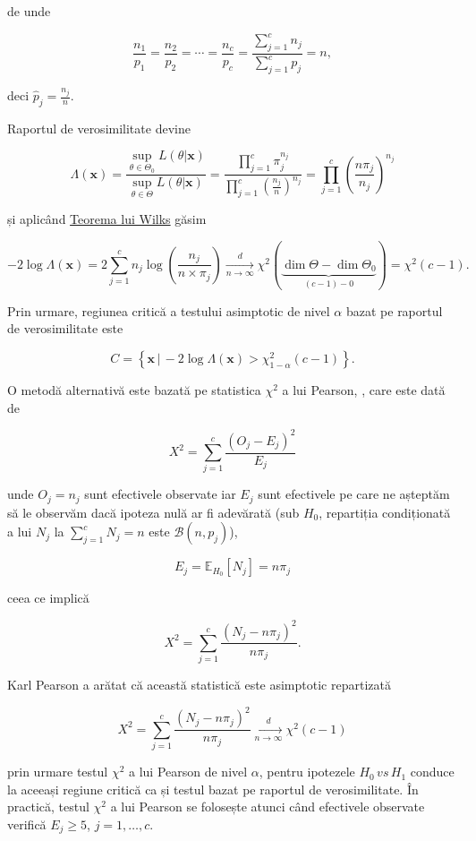 \documentclass[]{article}
\begin{document}
de unde

\[
  \frac{n_1}{p_1} = \frac{n_2}{p_2} = \cdots = \frac{n_c}{p_c} = \frac{\sum_{j = 1}^{c}n_j}{\sum_{j = 1}^{c}p_j} = n,
\]

deci \(\hat{p}_{j} = \frac{n_j}{n}\).

Raportul de verosimilitate devine

\[
\Lambda(\mathbf{x})=\frac{\sup_{\theta\in\Theta_0}L(\theta|\mathbf{x})}{\sup_{\theta\in\Theta}L(\theta|\mathbf{x})} = \frac{\prod_{j = 1}^{c} \pi_{j}^{n_{j}}}{\prod_{j = 1}^{c} \left(\frac{n_{j}}{n}\right)^{n_{j}}} = \prod_{j = 1}^{c}\left(\frac{n\pi_{j}}{n_j}\right)^{n_{j}}
\]

și aplicând
\href{https://en.wikipedia.org/wiki/Likelihood-ratio_test}{Teorema lui
Wilks} găsim

\[
  -2\log \Lambda(\mathbf{x}) = 2\sum_{j = 1}^{c} n_{j}\log\left(\frac{n_{j}}{n\times \pi_{j}}\right) \underset{n\to\infty}{\overset{d}{\longrightarrow}}\chi^2(\underbrace{\dim{\Theta} - \dim{\Theta_0}}_{(c-1)-0}) = \chi^2(c-1).
\]

Prin urmare, regiunea critică a testului asimptotic de nivel \(\alpha\)
bazat pe raportul de verosimilitate este

\[
  C = \left\{\mathbf{x} \,|\, -2\log \Lambda(\mathbf{x}) > \chi^2_{1-\alpha}(c-1)\right\}.
\]

O metodă alternativă este bazată pe statistica \(\chi^2\) a lui Pearson,
\citep{Pearson1900}, care este dată de

\[
  X^2 = \sum_{j = 1}^{c}\frac{(O_{j} - E_{j})^2}{E_{j}}
\]

unde \(O_{j} = n_{j}\) sunt efectivele observate iar \(E_{j}\) sunt
efectivele pe care ne așteptăm să le observăm dacă ipoteza nulă ar fi
adevărată (sub \(H_0\), repartiția condiționată a lui \(N_{j}\) la
\(\sum_{j = 1}^{c}N_{j} = n\) este \(\mathcal{B}(n,p_{j})\)),

\[
  E_{j} = \mathbb{E}_{H_0}[N_{j}] = n \pi_j
\]

ceea ce implică

\[
  X^2 = \sum_{j = 1}^{c}\frac{\left(N_{j} - n \pi_j\right)^2}{n \pi_j}.
\]

Karl Pearson a arătat că această statistică este asimptotic repartizată

\[
  X^2 = \sum_{j = 1}^{c}\frac{\left(N_{j} - n \pi_j\right)^2}{n \pi_j} \underset{n\to\infty}{\overset{d}{\longrightarrow}} \chi^2(c-1)
\]

prin urmare testul \(\chi^2\) a lui Pearson de nivel \(\alpha\), pentru
ipotezele \(H_0\,vs\,H_1\) conduce la aceeași regiune critică ca și
testul bazat pe raportul de verosimilitate. În practică, testul
\(\chi^2\) a lui Pearson se folosește atunci când efectivele observate
verifică \(E_j\geq 5\), \(j = 1,\ldots, c\).
\end{document}
